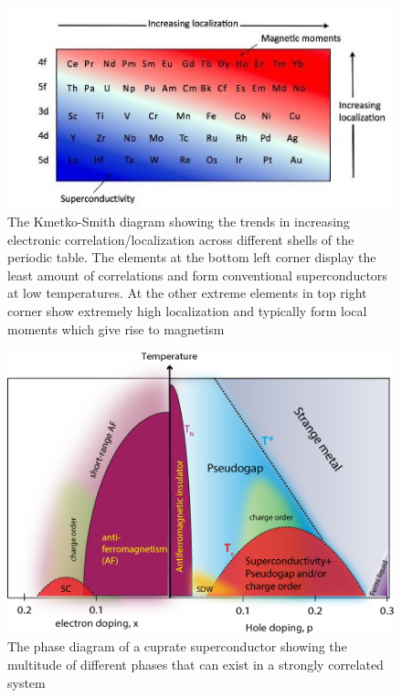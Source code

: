 \documentclass[10pt]{ruthesis}
\begin{document}
\begin{figure}[H]
\includegraphics[width=\columnwidth]{Knetko-Smith.jpg}
\caption{The Kmetko-Smith diagram showing the trends in increasing electronic correlation/localization across different shells of the periodic table. The elements at the bottom left corner display the least amount of correlations and form conventional superconductors at low temperatures. At the other extreme elements in top right corner show extremely high localization and typically form local moments which give rise to magnetism \protect \footnotemark \label{Knetko}}

\end{figure}


\begin{figure}[H]
\includegraphics[width=\columnwidth]{cuprate_phase.png}
\caption{The phase diagram of a cuprate superconductor showing the multitude of different phases that can exist in a strongly correlated system  \protect \footnotemark \label{cuprate_phase}  }
\end{figure}
\end{document}
